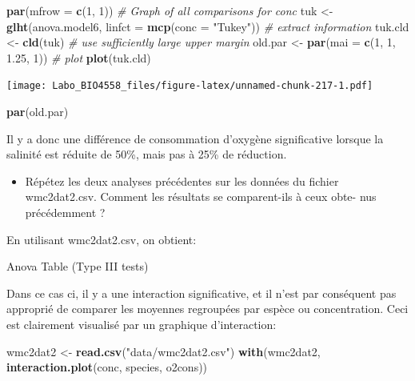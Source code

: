\documentclass[12pt,]{book}
\newenvironment{Shaded}{\begin{snugshade}}{\end{snugshade}}
\newcommand{\CommentTok}[1]{\textcolor[rgb]{0.37,0.37,0.37}{\textit{#1}}}
\newcommand{\DataTypeTok}[1]{\textcolor[rgb]{0.27,0.27,0.27}{#1}}
\newcommand{\DecValTok}[1]{\textcolor[rgb]{0.06,0.06,0.06}{#1}}
\newcommand{\FloatTok}[1]{\textcolor[rgb]{0.06,0.06,0.06}{#1}}
\newcommand{\KeywordTok}[1]{\textcolor[rgb]{0.27,0.27,0.27}{\textbf{#1}}}
\newcommand{\NormalTok}[1]{#1}
\newcommand{\StringTok}[1]{\textcolor[rgb]{0.5,0.5,0.5}{#1}}
\providecommand{\tightlist}{%
  \setlength{\itemsep}{0pt}\setlength{\parskip}{0pt}}
\begin{document}
\begin{Shaded}
\begin{Highlighting}[]
\KeywordTok{par}\NormalTok{(}\DataTypeTok{mfrow =} \KeywordTok{c}\NormalTok{(}\DecValTok{1}\NormalTok{, }\DecValTok{1}\NormalTok{))}
\CommentTok{# Graph of all comparisons for conc}
\NormalTok{tuk <-}\StringTok{ }\KeywordTok{glht}\NormalTok{(anova.model6, }\DataTypeTok{linfct =} \KeywordTok{mcp}\NormalTok{(}\DataTypeTok{conc =} \StringTok{"Tukey"}\NormalTok{))}
\CommentTok{# extract information}
\NormalTok{tuk.cld <-}\StringTok{ }\KeywordTok{cld}\NormalTok{(tuk)}
\CommentTok{# use sufficiently large upper margin}
\NormalTok{old.par <-}\StringTok{ }\KeywordTok{par}\NormalTok{(}\DataTypeTok{mai =} \KeywordTok{c}\NormalTok{(}\DecValTok{1}\NormalTok{, }\DecValTok{1}\NormalTok{, }\FloatTok{1.25}\NormalTok{, }\DecValTok{1}\NormalTok{))}
\CommentTok{# plot}
\KeywordTok{plot}\NormalTok{(tuk.cld)}
\end{Highlighting}
\end{Shaded}

\texttt{[image: Labo\_BIO4558\_files/figure-latex/unnamed-chunk-217-1.pdf]}

\begin{Shaded}
\begin{Highlighting}[]
\KeywordTok{par}\NormalTok{(old.par)}
\end{Highlighting}
\end{Shaded}

Il y a donc une différence de consommation d'oxygène significative lorsque la salinité est réduite de 50\%, mais pas à 25\% de réduction.

\begin{itemize}
\tightlist
\item
  Répétez les deux analyses précédentes sur les données du fichier wmc2dat2.csv. Comment les résultats se comparent-ils à ceux obte- nus précédemment ?
\end{itemize}

En utilisant wmc2dat2.csv, on obtient:

Anova Table (Type III tests)

Dans ce cas ci, il y a une interaction significative, et il n'est par conséquent pas approprié de comparer les moyennes regroupées par espèce ou concentration. Ceci est clairement visualisé par un graphique d'interaction:

\begin{Shaded}
\begin{Highlighting}[]
\NormalTok{wmc2dat2 <-}\StringTok{ }\KeywordTok{read.csv}\NormalTok{(}\StringTok{"data/wmc2dat2.csv"}\NormalTok{)}
\KeywordTok{with}\NormalTok{(wmc2dat2, }\KeywordTok{interaction.plot}\NormalTok{(conc, species, o2cons))}
\end{Highlighting}
\end{Shaded}
\end{document}
